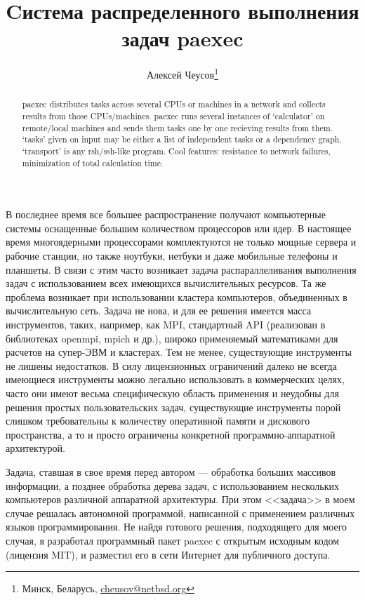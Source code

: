 \documentclass[10pt, a5paper]{article}
\begin{document}
\title{Cистема распределенного выполнения задач paexec }
\author{Алексей Чеусов\footnote{Минск, Беларусь, \url{cheusov@netbsd.org}}}
\def\progref!#1!{\texttt{#1}}

\maketitle

\begin{abstract}paexec distributes tasks across several CPUs or machines in a
network and collects results from those CPUs/machines. paexec runs
several instances of `calculator' on remote/local machines and sends
them tasks one by one recieving results from them. `tasks' given on
input may be either a list of independent tasks or a dependency
graph. `transport' is any rsh/ssh-like program. Cool features:
resistance to network failures, minimization of total calculation
time.
\end{abstract}

В последнее время все большее распространение получают компьютерные
системы оснащенные большим количеством процессоров или ядер.  В
настоящее время многоядерными процессорами комплектуются не только
мощные сервера и рабочие станции, но также ноутбуки, нетбуки и
даже мобильные телефоны и планшеты. В связи с этим часто возникает
задача распараллеливания выполнения задач с использованием всех
имеющихся вычислительных ресурсов. Та же проблема возникает при
использовании кластера компьютеров, объединенных в вычислительную
сеть. Задача не нова, и для ее решения имеется масса инструментов,
таких, например, как MPI, стандартный API (реализован в библиотеках
openmpi, mpich и др.), широко применяемый математиками для расчетов на
супер-ЭВМ и кластерах.  Тем не менее, существующие инструменты не
лишены недостатков.  В силу лицензионных ограничений далеко не всегда
имеющиеся инструменты можно легально использовать в коммерческих
целях, часто они имеют весьма специфическую область применения и
неудобны для решения простых пользовательских задач, существующие
инструменты порой слишком требовательны к количеству оперативной
памяти и дискового пространства, а то и просто ограничены конкретной
программно-аппаратной архитектурой.

Задача, ставшая в свое время перед автором --- обработка больших
массивов информации, а позднее обработка дерева задач, с
использованием нескольких компьютеров различной аппаратной
архитектуры. При этом <<задача>> в моем случае решалась автономной
программой, написанной с применением различных языков
программирования. Не найдя готового решения, подходящего для моего
случая, я разработал программный пакет paexec с открытым исходным
кодом (лицензия MIT), и разместил его в сети Интернет для публичного
доступа.
\end{document}

